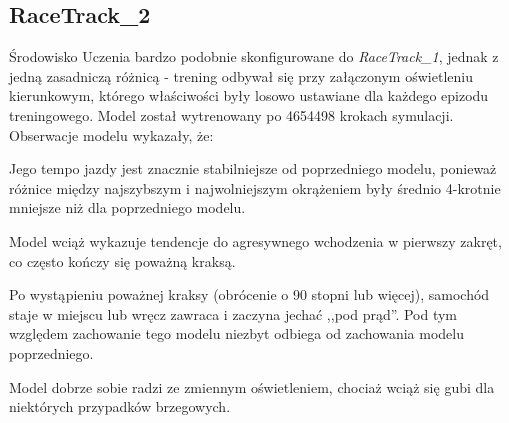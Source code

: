 \subsection{RaceTrack\_2}
Środowisko Uczenia bardzo podobnie skonfigurowane do \textit{RaceTrack\_1}, jednak z jedną zasadniczą różnicą - trening odbywał się przy załączonym oświetleniu kierunkowym, którego właściwości były losowo ustawiane dla każdego epizodu treningowego. Model został wytrenowany po 4654498 krokach symulacji. Obserwacje modelu wykazały, że:
\begin{enumerate*}
\item Jego tempo jazdy jest znacznie stabilniejsze od poprzedniego modelu, ponieważ różnice między najszybszym i najwolniejszym okrążeniem były średnio 4-krotnie mniejsze niż dla poprzedniego modelu.
\item Model wciąż wykazuje tendencje do agresywnego wchodzenia w pierwszy zakręt, co często kończy się poważną kraksą.
\item Po wystąpieniu poważnej kraksy (obrócenie o 90 stopni lub więcej), samochód staje w miejscu lub wręcz zawraca i zaczyna jechać ,,pod prąd''. Pod tym względem zachowanie tego modelu niezbyt odbiega od zachowania modelu poprzedniego.
\item Model dobrze sobie radzi ze zmiennym oświetleniem, chociaż wciąż się gubi dla niektórych przypadków brzegowych.
\end{enumerate*}

